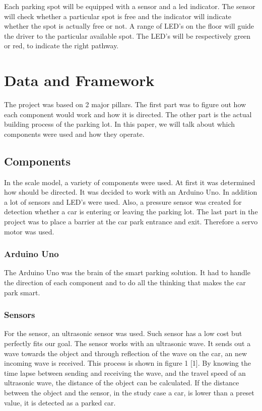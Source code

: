 \documentclass[10pt,twocolumn]{article}
\begin{document}
Each parking spot will be equipped with a sensor and a led indicator. The sensor will check whether a particular spot is free and the indicator will indicate whether the spot is actually free or not. A range of LED’s on the floor will guide the driver to the particular available spot. The LED’s will be respectively green or red, to indicate the right pathway.






\section{Data and Framework}

The project was based on 2 major pillars. The first part was to figure out how each component would work and how it is directed. The other part is the actual building process of the parking lot. In this paper, we will talk about which components were used and how they operate.

\subsection{Components}
In the scale model, a variety of components were used. At first it was determined how should be directed. It was decided to work with an Arduino Uno. In addition a lot of sensors and LED’s were used. Also, a pressure sensor was created for detection whether a car is entering or leaving the parking lot. The last part in the project was to place a barrier at the car park entrance and exit. Therefore a servo motor was used.

\subsubsection{Arduino Uno}
The Arduino Uno was the brain of the smart parking solution. It had to handle the direction of each component and to do all the thinking that makes the car park smart.

\subsubsection{Sensors}
For the sensor, an ultrasonic sensor was used. Such sensor has a low cost but perfectly fits our goal. The sensor works with an ultrasonic wave. It sends out a wave towards the object and through reflection of the wave on the car, an new incoming wave is received. This process is shown in figure 1 [1]. By knowing the time lapse between sending and receiving the wave, and the travel speed of an ultrasonic wave, the distance of the object can be calculated. If the distance between the object and the sensor, in the study case a car, is lower than a preset value, it is detected as a parked car. 
\end{document}
